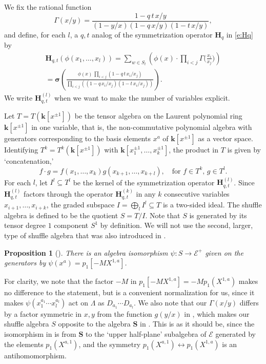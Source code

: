 \documentclass[12pt]{amsart}
\newtheorem{prop}[thm]{Proposition}
\theoremstyle{definition}
\theoremstyle{remark}
\newcommand{\kk}{{\mathbf k}}
\newcommand{\Hbold}{{\mathbf H}}
\newcommand{\Sbold}{{\mathbf S}}
\newcommand{\sigmabold}{{\boldsymbol \sigma }}
\newcommand{\Ecal}{{\mathcal E}}
\begin{document}
We fix the rational function
\begin{equation}\label{e:Gamma}
\Gamma (x/y) = \frac{1-q\, t\, x/y}{(1-y/x)(1-q\, x/y)(1-t\, x/y)},
\end{equation}
and define, for each $l$, a $q,t$ analog of the symmetrization
operator $\Hbold _{q}$ in \eqref{e:Hq} by
\begin{multline}\label{e:Hqt}
\Hbold _{q,t}(\phi (x_{1},\ldots,x_{l})) = \sum _{w\in S_{l}} \left(
\phi(x) \cdot \prod _{i<j} \Gamma \bigl(\frac{x_{i}}{x_{j}}\bigr) \right)\\
 = \sigmabold \left(\frac{\phi (x)\, \prod _{i<j} (1 - q\, t\,
x_{i}/x_{j})}{\prod _{i<j} ((1 - q\, x_{i}/x_{j}) (1 - t\,
x_{i}/x_{j}))} \right).
\end{multline}
We write $\Hbold _{q,t}^{(l)}$ when we want to make the number of
variables explicit.


Let $T = T(\kk [x^{\pm 1}])$ be the tensor algebra on the Laurent
polynomial ring $\kk [x^{\pm 1}]$ in one variable, that is, the
non-commutative polynomial algebra with generators corresponding to
the basis elements $x^{a}$ of $\kk [x^{\pm 1}]$ as a vector space.
Identifying $T^{k} = T^{k}(\kk [x^{\pm 1}])$ with $\kk [x_{1}^{\pm
1},\ldots,x_{k}^{\pm 1}]$, the product in $T$ is given by
`concatenation,'
\begin{equation}\label{e:concatenation-product}
f\cdot g = f(x_{1},\ldots,x_{k})g(x_{k+1},\ldots,x_{k+l}),\quad
\text{for $f\in T^{k}$, $g\in T^{l}$}.
\end{equation}
For each $l$, let $I^{l}\subseteq T^{l}$ be the kernel of the
symmetrization operator $\Hbold _{q,t}^{(l)}$.  Since $\Hbold
_{q,t}^{(l)}$ factors through the operator $\Hbold _{q,t}^{(k)}$ in
any $k$ consecutive variables $x_{i+1},\ldots,x_{i+k}$, the graded
subspace $I = \bigoplus _{l}I^{l}\subseteq T$ is a two-sided ideal.
The shuffle algebra is defined to be the quotient $S = T/I$.  Note
that $S$ is generated by its tensor degree $1$ component $S^{1}$ by
definition.  We will not use the second, larger, type of shuffle
algebra that was also introduced in \cite{FeigTsym11,Negut14}.

\begin{prop}[{\cite[Theorem 10.1]{SchiVass13}}]
\label{prop:shuffle-isomorphism} There is an algebra isomorphism $\psi
\colon S \rightarrow \Ecal ^{+}$ given on the generators by $\psi
(x^{a}) = p_{1}[-MX^{1,a}]$.
\end{prop}

For clarity, we note that the factor $-M$ in $p_{1}[-MX^{1,a}] = -M
p_{1}(X^{1,a})$ makes no difference to the statement, but is a
convenient normalization for us, since it makes $\psi
(x_{1}^{a_{1}}\cdots x_{l}^{a_{l}})$ act on $\Lambda $ as
$D_{a_{1}}\cdots D_{a_{l}}$.  We also note that our $\Gamma (x/y)$
differs by a factor symmetric in $x,y$ from the function $g(y/x)$ in
\cite[(10.3)]{SchiVass13}, which makes our shuffle algebra $S$
opposite to the algebra $\Sbold $ in \cite{SchiVass13}.  This is as it
should be, since the isomorphism in \cite{SchiVass13} is from $\Sbold
$ to the `upper half-plane' subalgebra of $\Ecal $ generated by the
elements $p_{1}(X^{a,1})$, and the symmetry
$p_{1}(X^{a,1})\leftrightarrow p_{1}(X^{1,a})$ is an antihomomorphism.
\end{document}
